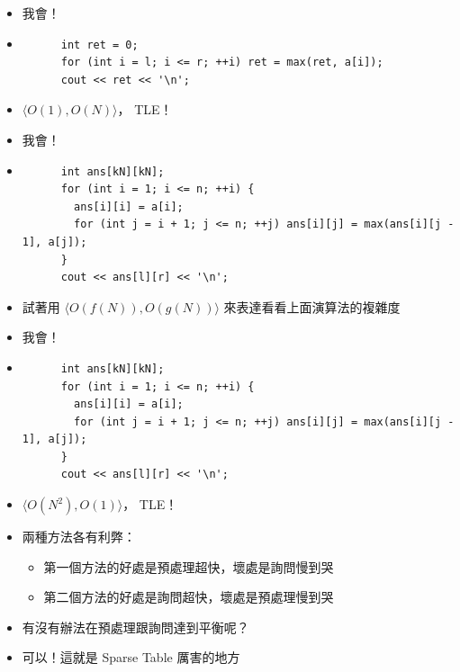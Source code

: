 \documentclass[standalone]{beamer}
\begin{document}
\begin{frame}[fragile]{}
  \begin{itemize}
    \item 我會！
    \item 
    \begin{verbatim}
      int ret = 0;
      for (int i = l; i <= r; ++i) ret = max(ret, a[i]);
      cout << ret << '\n';
    \end{verbatim}
    \item \(\langle {O}(1), {O}(N)\rangle\)， TLE！
  \end{itemize}
\end{frame}

\begin{frame}[fragile]{}
  \begin{itemize}
    \item 我會！
    \item 
    \begin{verbatim}
      int ans[kN][kN];
      for (int i = 1; i <= n; ++i) {
        ans[i][i] = a[i];
        for (int j = i + 1; j <= n; ++j) ans[i][j] = max(ans[i][j - 1], a[j]);
      }
      cout << ans[l][r] << '\n';
    \end{verbatim}
    \item 試著用 \(\langle {O}(f(N)), {O}(g(N))\rangle\) 來表達看看上面演算法的複雜度
  \end{itemize}
\end{frame}

\begin{frame}[fragile]{}
  \begin{itemize}
    \item 我會！
    \item 
    \begin{verbatim}
      int ans[kN][kN];
      for (int i = 1; i <= n; ++i) {
        ans[i][i] = a[i];
        for (int j = i + 1; j <= n; ++j) ans[i][j] = max(ans[i][j - 1], a[j]);
      }
      cout << ans[l][r] << '\n';
    \end{verbatim}
    \item \(\langle {O}(N^2), {O}(1)\rangle\)， TLE！
  \end{itemize}
\end{frame}

\begin{frame}[fragile]{}
  \begin{itemize}
    \item 兩種方法各有利弊：
    \begin{itemize}
      \item 第一個方法的好處是預處理超快，壞處是詢問慢到哭
      \item 第二個方法的好處是詢問超快，壞處是預處理慢到哭
    \end{itemize}
    \item 有沒有辦法在預處理跟詢問達到平衡呢？
    \item 可以！這就是 Sparse Table 厲害的地方
  \end{itemize}
\end{frame}
\end{document}
